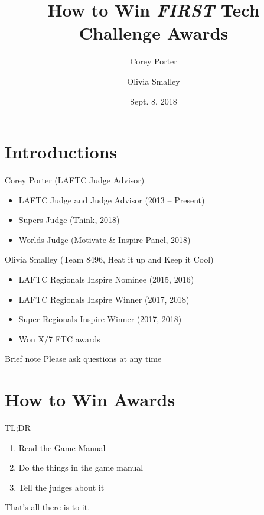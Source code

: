 \documentclass{beamer}
\title{How to Win \textit{FIRST} Tech Challenge Awards}
\date{Sept. 8, 2018}
\author{
  Corey Porter\\
  \and
  Olivia Smalley\\
}
\institute{\textit{FIRST} Tech Challenge Southern California}
\begin{document}
  \maketitle
  \section{Introductions}
  \begin{frame}{Corey Porter (LAFTC Judge Advisor)}
    \begin{itemize}
    \item LAFTC Judge and Judge Advisor (2013 -- Present)
    \item Supers Judge (Think, 2018)
    \item Worlds Judge (Motivate \& Inspire Panel, 2018)
    \end{itemize}
  \end{frame}
  \begin{frame}{Olivia Smalley (Team 8496, Heat it up and Keep it Cool)}
    \begin{itemize}
    \item LAFTC Regionals Inspire Nominee (2015, 2016)
    \item LAFTC Regionals Inspire Winner (2017, 2018)
    \item Super Regionals Inspire Winner (2017, 2018)
    \item Won X/7 FTC awards
    \end{itemize}
  \end{frame}

  \begin{frame}{Brief note}
    \huge{Please ask questions at any time}
  \end{frame}

  \section{How to Win Awards}

  \begin{frame}{TL;DR}
    \begin{enumerate}
    \item{Read the Game Manual} \pause
    \item{Do the things in the game manual} \pause
    \item{Tell the judges about it} \pause
    \end{enumerate}
    \par
    That's all there is to it.
  \end{frame}
\end{document}
